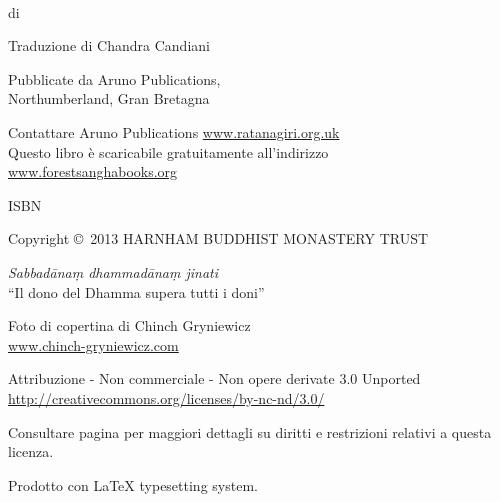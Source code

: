 {\copyrightsize\setlength{\parskip}{0.5\baselineskip}\setlength{\parindent}{0em}%
\raggedright%
\shaker\color[gray]{0.3}

\thetitle\\
di \theauthor

Traduzione di Chandra Candiani

Pubblicate da Aruno Publications,\\
Northumberland, Gran Bretagna

Contattare Aruno Publications \href{http://ratanagiri.org.uk/}{www.ratanagiri.org.uk}\\
Questo libro \`{e} scaricabile gratuitamente all'indirizzo\\
\href{http://forestsanghabooks.org/}{www.forestsanghabooks.org}

ISBN \theISBN

Copyright \copyright\ 2013 HARNHAM BUDDHIST MONASTERY TRUST

\textit{Sabbadānaṃ dhammadānaṃ jinati}\\
``Il dono del Dhamma supera tutti i doni''

Foto di copertina di Chinch Gryniewicz\\
\href{http://chinch-gryniewicz.com}{www.chinch-gryniewicz.com}

{\tiny

Attribuzione - Non commerciale - Non opere derivate 3.0 Unported\\
\href{http://creativecommons.org/licenses/by-nc-nd/3.0/}{http://creativecommons.org/licenses/by-nc-nd/3.0/}

Consultare pagina \pageref{copyright-details} per maggiori dettagli su diritti e restrizioni relativi a questa licenza.

Prodotto con {\selectfont\LaTeX} typesetting system.

\theEditionInfo

}}

